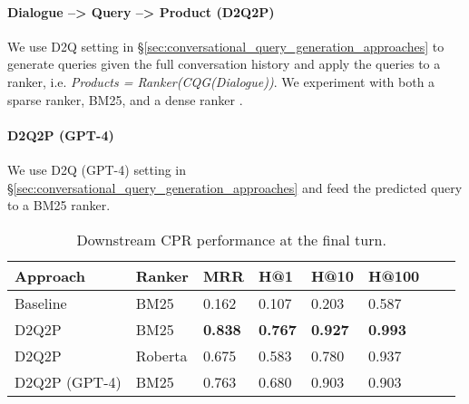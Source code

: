 \vspace{-0.5em}
\paragraph{Dialogue --> Query --> Product (D2Q2P)} We use D2Q setting in \S\ref{sec:conversational_query_generation_approaches} to generate queries given the full conversation history and apply the queries to a ranker, i.e. \textit{Products = Ranker(CQG(Dialogue))}. We experiment with both a sparse ranker, BM25, and a dense ranker \citep[fine-tuned RoBERTa;][]{liu2019roberta}.

\paragraph{D2Q2P (GPT-4)} We use D2Q (GPT-4) setting in \S\ref{sec:conversational_query_generation_approaches} and feed the predicted query to a BM25 ranker.

\begin{table}[t]  \small
\centering
\setlength{\tabcolsep}{2pt} %
\renewcommand{\arraystretch}{1.0} %
\begin{tabular}{llllllll}
\hline
\textbf{Approach} & \textbf{Ranker} & \textbf{MRR} & \textbf{H@1} & \textbf{H@10} & \textbf{H@100}\\ \hline
Baseline & BM25& 0.162 & 0.107 & 0.203 & 0.587 \\ \hline \hline
D2Q2P & BM25& \textbf{0.838} & \textbf{0.767}  & \textbf{0.927} & \textbf{0.993} \\
D2Q2P & Roberta & 0.675 & 0.583  & 0.780 & 0.937 \\ \hline
D2Q2P (GPT-4) & BM25 & 0.763 & 0.680 & 0.903 & 0.903 \\ \hline 

\end{tabular}
\vspace{-0.5em}
\caption{Downstream CPR performance at the final turn.}
\label{tab:ranker}
\vspace{-2em}
\end{table}

